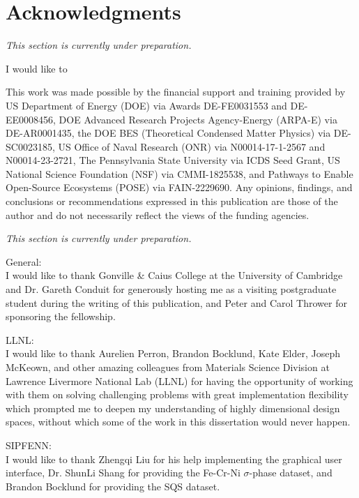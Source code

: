 \documentclass[letterpaper, 12pt]{report}
\newcommand{\todo}{
\begin{center}
\textcolor{mauroblue}{
\textit{
This section is currently under preparation.
}}
\end{center}
}
\begin{document}
\newpage
\tableofcontents

\newpage
{}
\renewcommand{\listfigurename}{List of Figures}
\listoffigures

\newpage
{}
\renewcommand{\listtablename}{List of Tables}
\listoftables

\newpage
\chapter*{Acknowledgments}
\label{acknowledgments}

\todo

I would like to 

This work was made possible by the financial support and training provided by US Department of Energy (DOE) via Awards DE-FE0031553 and DE-EE0008456, DOE Advanced Research Projects Agency-Energy (ARPA-E) via DE-AR0001435, the DOE BES (Theoretical Condensed Matter Physics) via DE-SC0023185, US Office of Naval Research (ONR) via N00014-17-1-2567 and N00014-23-2721, The Pennsylvania State University via ICDS Seed Grant, US National Science Foundation (NSF) via CMMI-1825538, and Pathways to Enable Open-Source Ecosystems (POSE) via FAIN-2229690. Any opinions, findings, and conclusions or recommendations expressed in this publication are those of the author and do not necessarily reflect the views of the funding agencies.

\todo

General:\\
I would like to thank Gonville \& Caius College at the University of Cambridge and Dr. Gareth Conduit for generously hosting me as a visiting postgraduate student during the writing of this publication, and Peter and Carol Thrower for sponsoring the fellowship.

LLNL:\\
I would like to thank Aurelien Perron, Brandon Bocklund, Kate Elder, Joseph McKeown, and other amazing colleagues from Materials Science Division at Lawrence Livermore National Lab (LLNL) for having the opportunity of working with them on solving challenging problems with great implementation flexibility which prompted me to deepen my understanding of highly dimensional design spaces, without which some of the work in this dissertation would never happen.

SIPFENN:\\
I would like to thank Zhengqi Liu for his help implementing the graphical user interface, Dr. ShunLi Shang for providing the Fe-Cr-Ni $\sigma$-phase dataset, and Brandon Bocklund for providing the SQS dataset.
\end{document}
